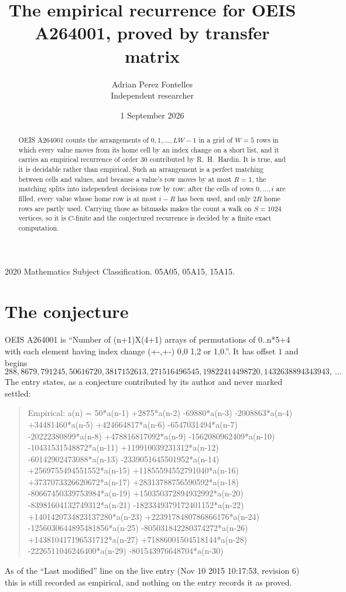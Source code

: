 \documentclass[11pt,a4paper]{article}
\title{The empirical recurrence for OEIS A264001, proved by transfer matrix}
\author{Adrian Perez Fontelles\\ \small Independent researcher}
\date{1 September 2026}
\theoremstyle{plain}
\theoremstyle{definition}
\begin{document}
\maketitle

\begin{abstract}
OEIS A264001 counts the arrangements of $0,1,\dots,LW-1$ in a grid of $W=5$ rows in which
every value moves from its home cell by an index change on a short list, and it carries an
empirical recurrence of order $30$ contributed by R.~H.~Hardin. It is true, and it is
decidable rather than empirical. Such an arrangement is a perfect matching between cells and
values, and because a value's row moves by at most $R=1$, the matching splits into
independent decisions row by row: after the cells of rows $0,\dots,i$ are filled,
every value whose home row is at most $i-R$ has been used, and only $2R$ home rows are
partly used. Carrying those as bitmasks makes the count a walk on $S=1024$ vertices, so it is
$C$-finite and the conjectured recurrence is decided by a finite exact computation.
\end{abstract}

\noindent\small 2020 Mathematics Subject Classification. 05A05, 05A15, 15A15.\normalsize

\section{The conjecture}

OEIS A264001 is ``Number of (n+1)X(4+1) arrays of permutations of 0..n*5+4 with each element having index change (+-,+-) 0,0 1,2 or 1,0.''. It has offset $1$ and begins
\[
288, 8679, 791245, 50616720, 3817152613, 271516496545, 19822414498720, 1432638894343943,\ \dots
\]
The entry states, as a conjecture contributed by its author and never marked settled:
\begin{quote}
Empirical: a(n) = 50*a(n-1) +2875*a(n-2) -69880*a(n-3) -2008863*a(n-4) +34481460*a(n-5) +424664817*a(n-6) -6547031494*a(n-7) -20222380899*a(n-8) +478816817092*a(n-9) -1562080962409*a(n-10) -10431531548872*a(n-11) +119910039231312*a(n-12) -60142902473088*a(n-13) -2339051645501952*a(n-14) +2569755494551552*a(n-15) +11855594552791040*a(n-16) +3737073326620672*a(n-17) +28313788756590592*a(n-18) -80667450339753984*a(n-19) +150350372894932992*a(n-20) -83981604132749312*a(n-21) -1823349379172401152*a(n-22) +1401420734823137280*a(n-23) +2239178480786866176*a(n-24) -1256030644895481856*a(n-25) -805031842280374272*a(n-26) +143810417196531712*a(n-27) +71886001504518144*a(n-28) -2226511046246400*a(n-29) -801543976648704*a(n-30)
\end{quote}
As of the ``Last modified'' line on the live entry (Nov 10 2015 10:17:53, revision 6) this is still
recorded as empirical, and nothing on the entry records it as proved.
\end{document}
